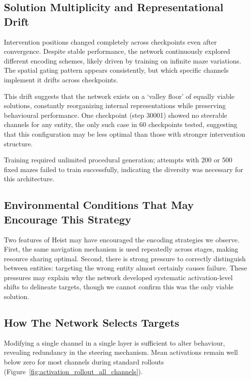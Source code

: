\subsection{Solution Multiplicity and Representational Drift}
Intervention positions changed completely across checkpoints even after convergence. Despite stable performance, the network continuously explored different encoding schemes, likely driven by training on infinite maze variations. The spatial gating pattern appears consistently, but which specific channels implement it drifts across checkpoints.

This drift suggests that the network exists on a `valley floor' of equally viable solutions, constantly reorganizing internal representations while preserving behavioural performance. One checkpoint (step 30001) showed no steerable channels for any entity, the only such case in 60 checkpoints tested, suggesting that this configuration may be less optimal than those with stronger intervention structure.

Training required unlimited procedural generation; attempts with 200 or 500 fixed mazes failed to train successfully, indicating the diversity was necessary for this architecture. 


\subsection{Environmental Conditions That May Encourage This Strategy}

Two features of Heist may have encouraged the encoding strategies we observe. First, the same navigation mechanism is used repeatedly across stages, making resource sharing optimal. Second, there is strong pressure to correctly distinguish between entities: targeting the wrong entity almost certainly causes failure. These pressures may explain why the network developed systematic activation-level shifts to delineate targets, though we cannot confirm this was the only viable solution.

\subsection{How The Network Selects Targets}

Modifying a single channel in a single layer is sufficient to alter behaviour, revealing redundancy in the steering mechanism. Mean activations remain well below zero for most channels during standard rollouts (Figure~\ref{fig:activation_rollout_all_channels}).

